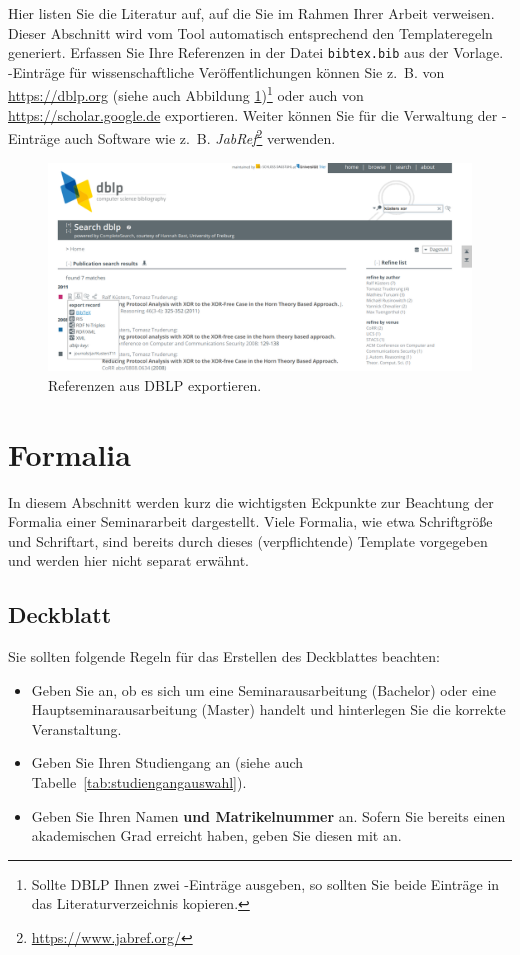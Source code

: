 Hier listen Sie die Literatur auf, auf die Sie im Rahmen Ihrer Arbeit verweisen. Dieser Abschnitt
wird vom Tool  automatisch entsprechend den Templateregeln generiert. Erfassen Sie
Ihre Referenzen in der Datei \texttt{bibtex.bib} aus der Vorlage. -Einträge für
wissenschaftliche Veröffentlichungen können Sie z.~B. von \url{https://dblp.org} (siehe auch
Abbildung \ref{abb:dblp})\footnote{Sollte DBLP Ihnen zwei -Einträge ausgeben, so
  sollten Sie beide Einträge in das Literaturverzeichnis kopieren.} oder auch von
\url{https://scholar.google.de} exportieren. Weiter können Sie für die Verwaltung der
-Einträge auch Software wie z.~B.
\emph{JabRef}\footnote{\url{https://www.jabref.org/}} verwenden.

\begin{figure}
    \centering
    \includegraphics[width=\textwidth]{dblp.png}
    \caption{ Referenzen aus DBLP exportieren.}
    \label{abb:dblp}
\end{figure}


\section{Formalia}
In diesem Abschnitt werden kurz die wichtigsten Eckpunkte zur Beachtung der Formalia einer
Seminararbeit dargestellt. Viele Formalia, wie etwa Schriftgröße und Schriftart, sind bereits durch
dieses (verpflichtende) Template vorgegeben und werden hier nicht separat erwähnt.


\subsection{Deckblatt}
Sie sollten folgende Regeln für das Erstellen des Deckblattes beachten:
\begin{itemize}
\item Geben Sie an, ob es sich um eine Seminarausarbeitung (Bachelor) oder eine
  Hauptseminarausarbeitung (Master) handelt und hinterlegen Sie die korrekte Veranstaltung.
\item Geben Sie Ihren Studiengang an (siehe auch Tabelle~\ref{tab:studiengangauswahl}).
\item Geben Sie Ihren Namen \textbf{und Matrikelnummer} an. Sofern Sie bereits einen akademischen
  Grad erreicht haben, geben Sie diesen mit an.
\end{itemize}

